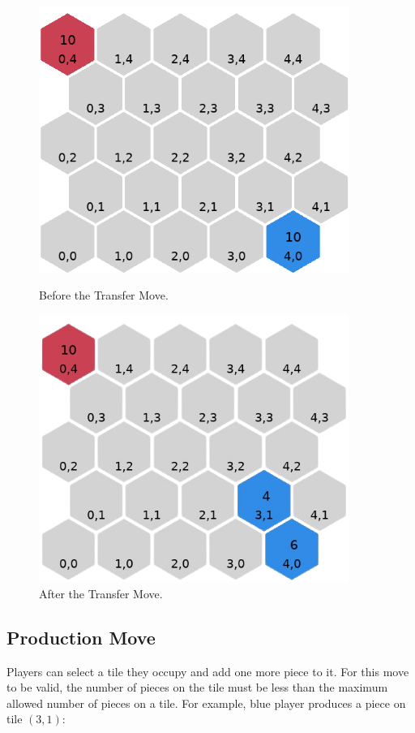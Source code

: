 \documentclass[letterpaper, 12pt]{article}
\begin{document}
\begin{figure}[H]
  \begin{minipage}[c]{.5\textwidth}
    \centering
    \includegraphics[width=0.9\textwidth]{transfer_example_1.png}
    \caption{Before the Transfer Move.}
  \end{minipage}%
  \begin{minipage}[c]{.5\textwidth} \centering
    \includegraphics[width=0.9\textwidth]{transfer_example_2.png}
    \caption{After the Transfer Move.}
  \end{minipage}
\end{figure}

\subsection*{Production Move}
Players can select a tile they occupy and add one more piece to it. For this move to be
valid, the number of pieces on the tile must be less than the maximum allowed number of
pieces on a tile. For example, blue player produces a piece on tile \((3, 1)\):
\end{document}
